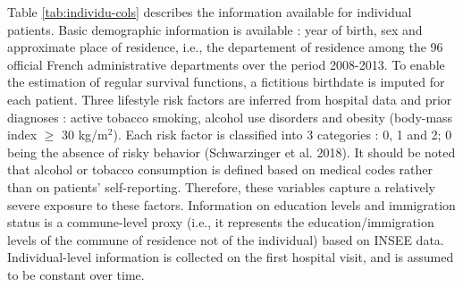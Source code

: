 \documentclass{article}
\begin{document}
Table \ref{tab:individu-cols} describes the information available for
individual patients. Basic demographic information is available : year
of birth, sex and approximate place of residence, i.e., the departement
of residence among the 96 official French administrative departments
over the period 2008-2013. To enable the estimation of regular survival
functions, a fictitious birthdate is imputed for each patient. Three
lifestyle risk factors are inferred from hospital data and prior
diagnoses : active tobacco smoking, alcohol use disorders and obesity
(body-mass index \(\geq\) 30 kg/m\(^2\)). Each risk factor is classified
into 3 categories : 0, 1 and 2; 0 being the absence of risky behavior
(Schwarzinger et al. 2018). It should be noted that alcohol or tobacco
consumption is defined based on medical codes rather than on patients'
self-reporting. Therefore, these variables capture a relatively severe
exposure to these factors. Information on education levels and
immigration status is a commune-level proxy (i.e., it represents the
education/immigration levels of the commune of residence not of the
individual) based on INSEE data. Individual-level information is
collected on the first hospital visit, and is assumed to be constant
over time.
\end{document}
